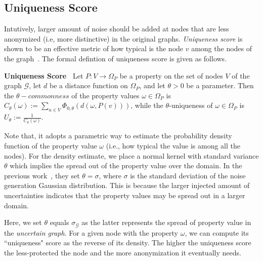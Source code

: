 \subsection{Uniqueness Score}
Intutively, larger amount of noise should be added at nodes that are less anonymized (i.e, more distinctive) in the original graphs. \emph{Uniqueness score} is shown to be an effective metric of how typical is the node $v$ among the nodes of the graph~\cite{Boldi_Injecting_2012}. The formal defintion of uniqueness score is given as follows. 
\begin{definition}
    \textbf{Uniqueness Score~\cite{Boldi_Injecting_2012}}
     Let $P:V \rightarrow  \Omega_{P}$ be a property on the set of nodes $V$ of the graph $\mathcal{G}$, let $d$ be a distance function on $\Omega_{P}$, and let $\theta >0$  be a parameter. 
  Then the $\theta-commonness$ of the property values $\omega \in \Omega_{P}$ is $C_{\theta}(\omega):= \sum_{u \in V} \Phi_{0,\theta}(d(\omega, P(v)))$,   
while the $\theta$-uniqueness of $\omega \in \Omega_{P}$ is $U_{\theta}:= \frac{1}{C_{\theta}(\omega)}$. 
\end{definition} 

Note that, it adopts a parametric way to estimate the probability density function of the property value $\omega$ (i.e., how typical the value is among all the nodes). For the density estimate, we place a normal kernel with standard variance 
$\theta$ which implies the spread out of the property value over the domain. In the previous work~\cite{Boldi_Injecting_2012}, they set $\theta=\sigma$, where $\sigma$ is the standard deviation of the noise generation Gaussian distribution. This is because the larger injected amount of uncertainties indicates that the property values may be spread out in a larger domain. 

Here, we set $\theta$ equals $\sigma_{\mathcal{G}}$ as the latter represents the spread of property value in the \emph{uncertain graph}. For a given node with the property $\omega$, we can compute its ``uniqueness" score as the reverse of its density. The higher the uniqueness score the less-protected the node and the more anonymization it eventually needs.





